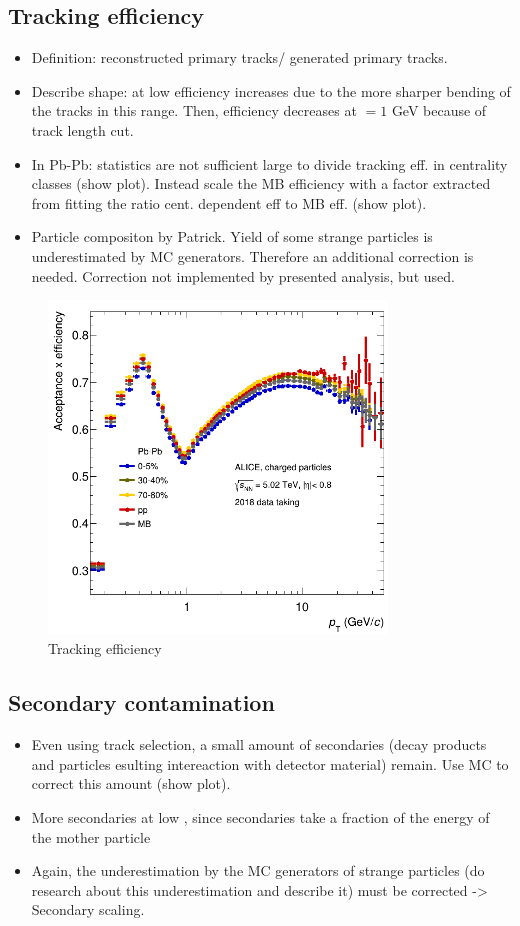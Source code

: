 \documentclass[12pt,a4paper]{report}
\begin{document}
\subsection{Tracking efficiency}
\begin{itemize}
\item Definition: reconstructed primary tracks/ generated  primary tracks. 
\item Describe shape: at low \pt efficiency increases due to the more sharper bending of the tracks in this \pt range. Then, efficiency decreases at \pt $= 1$ GeV  because of track length cut. 
\item In Pb-Pb: statistics are not sufficient large to divide tracking eff. in centrality classes (show plot). Instead scale the MB efficiency with a factor extracted from fitting the ratio cent. dependent eff to MB eff. (show plot). 
\item Particle compositon by Patrick. Yield of some strange particles is underestimated by MC generators. Therefore an additional correction is needed. Correction not implemented by presented analysis, but used. 
\end{itemize}
\begin{figure}[tb!]
\centering
\includegraphics[width=9cm]{Plots/trckEff.png}  
\caption{Tracking efficiency} 
\end{figure}

\subsection{Secondary contamination}
\begin{itemize}
\item Even using track selection, a small amount of secondaries (decay products and particles esulting intereaction with detector material) remain. Use MC to correct this amount (show plot). 
\item More secondaries at low \pt, since secondaries take a fraction of the energy of the mother particle 
\item Again, the underestimation by the MC generators of strange particles (do research about this underestimation and describe it) must be corrected -> Secondary scaling.
\end{itemize}
\end{document}

